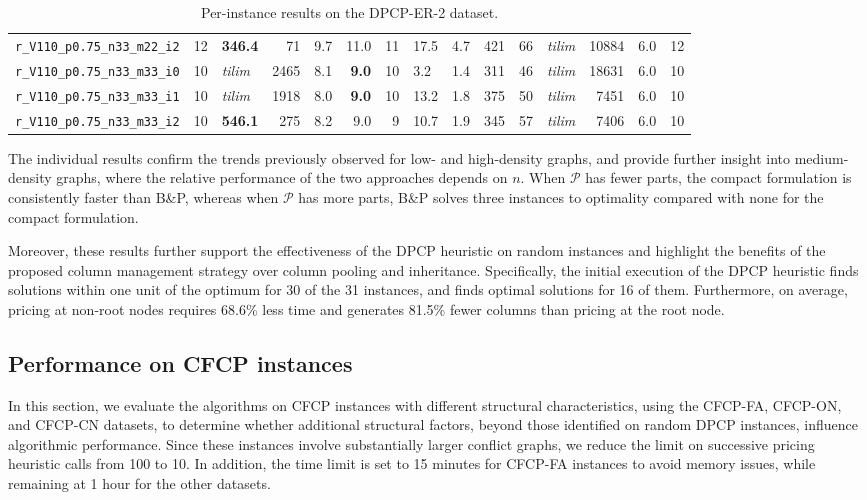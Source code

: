 \documentclass[preprint, 11pt, authoryear]{elsarticle}
\begin{document}
\begin{table}
\begin{tabular}{lrlrrrrllrrlrlr}
\texttt{r\_V110\_p0.75\_n33\_m22\_i2} & 12 & \textbf{346.4} & 71 & 9.7 & 11.0 & 11 & 17.5 & 4.7 & 421 & 66 & \textit{tilim} & 10884 & 6.0 & 12 \\
\texttt{r\_V110\_p0.75\_n33\_m33\_i0} & 10 & \textit{tilim} & 2465 & 8.1 & \textbf{9.0} & 10 & 3.2 & 1.4 & 311 & 46 & \textit{tilim} & 18631 & 6.0 & 10 \\
\texttt{r\_V110\_p0.75\_n33\_m33\_i1} & 10 & \textit{tilim} & 1918 & 8.0 & \textbf{9.0} & 10 & 13.2 & 1.8 & 375 & 50 & \textit{tilim} & 7451 & 6.0 & 10 \\
\texttt{r\_V110\_p0.75\_n33\_m33\_i2} & 10 & \textbf{546.1} & 275 & 8.2 & 9.0 & 9 & 10.7 & 1.9 & 345 & 57 & \textit{tilim} & 7406 & 6.0 & 10 \\
\bottomrule
\end{tabular}
\caption{Per-instance results on the DPCP-ER-2 dataset.}
\label{table.results.byp.inst}
\end{table}

The individual results confirm the trends previously observed for low- and high-density graphs, and provide further insight into medium-density graphs, where the relative performance of the two approaches depends on $n$.
When $\mathcal{P}$ has fewer parts, the compact formulation is consistently faster than B\&P, whereas when $\mathcal{P}$ has more parts, B\&P solves three instances to optimality compared with none for the compact formulation.

Moreover, these results further support the effectiveness of the DPCP heuristic on random instances  and highlight the benefits of the proposed column management strategy over column pooling and inheritance. Specifically, the initial execution of the DPCP heuristic finds solutions within one unit of the optimum for 30 of the 31 instances, and finds optimal solutions for 16 of them.
Furthermore, on average, pricing at non-root nodes requires 68.6\% less time and generates 81.5\% fewer columns than pricing at the root node.


\subsection{Performance on CFCP instances}

In this section, we evaluate the algorithms on CFCP instances with different structural characteristics, using the CFCP-FA, CFCP-ON, and CFCP-CN datasets, to determine whether additional structural factors, beyond those identified on random DPCP instances, influence algorithmic performance.
Since these instances involve substantially larger conflict graphs, we reduce the limit on successive pricing heuristic calls from 100 to 10. 
In addition, the time limit is set to 15 minutes for CFCP-FA instances to avoid memory issues, while remaining at 1 hour for the other datasets.
\end{document}
